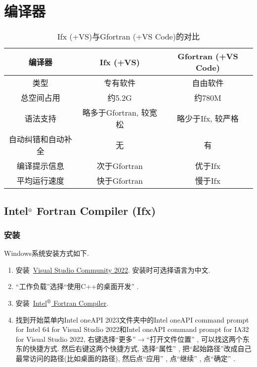\chapter{编译器}\label{fortran_compiler}
\def\r{${}^\text{\textregistered}$}

\begin{table}[!htbp]
    \centering
    \begin{tabular}{|c|c|c|}
        \hline
        编译器&Ifx (+VS)&Gfortran (+VS Code)\\
        \hline
        类型&专有软件&自由软件\\
        \hline
        总空间占用&约5.2G&约780M\\
        \hline
        语法支持&略多于Gfortran, 较宽松&略少于Ifx, 较严格\\
        \hline
        自动纠错和自动补全&无&有\\
        \hline
        编译提示信息&次于Gfortran&优于Ifx\\
        \hline
        平均运行速度&快于Gfortran&慢于Ifx\\
        \hline
    \end{tabular}
    \caption{Ifx (+VS)与Gfortran (+VS Code)的对比}
\end{table}

\section[Intel\r{} Fortran Compiler]{Intel\r{} Fortran Compiler (Ifx)}

\subsection{安装}

Windows系统安装方式如下.
\begin{enumerate}
    \item 安装~\href{https://visualstudio.microsoft.com/zh-hans/thank-you-downloading-visual-studio/?sku=Community&channel=Release&version=VS2022&source=VSLandingPage&cid=2030&passive=false}
    {Visual Studio Community 2022}. 安装时可选择语言为中文.
    \item ``工作负载''选择``使用C++的桌面开发'' .
    \item 安装~\href{https://registrationcenter-download.intel.com/akdlm/IRC_NAS/7feb5647-59dd-420d-8753-345d31e177dc/w_fortran-compiler_p_2024.2.0.424.exe}
    {Intel\r{} Fortran Compiler}.
    \item 找到开始菜单内Intel oneAPI 2023文件夹中的Intel oneAPI command prompt for Intel 64 for Visual Studio 2022和Intel oneAPI command prompt for IA32 for Visual Studio 2022, 右键选择``更多''$\rightarrow$``打开文件位置'' , 可以找这两个东东的快捷方式. 然后右键这两个快捷方式, 选择``属性'' , 把``起始路径''改成自己最常访问的路径(比如桌面的路径), 然后点``应用'' , 点``继续'' , 点``确定'' .\label{to_desktop}
\end{enumerate}

